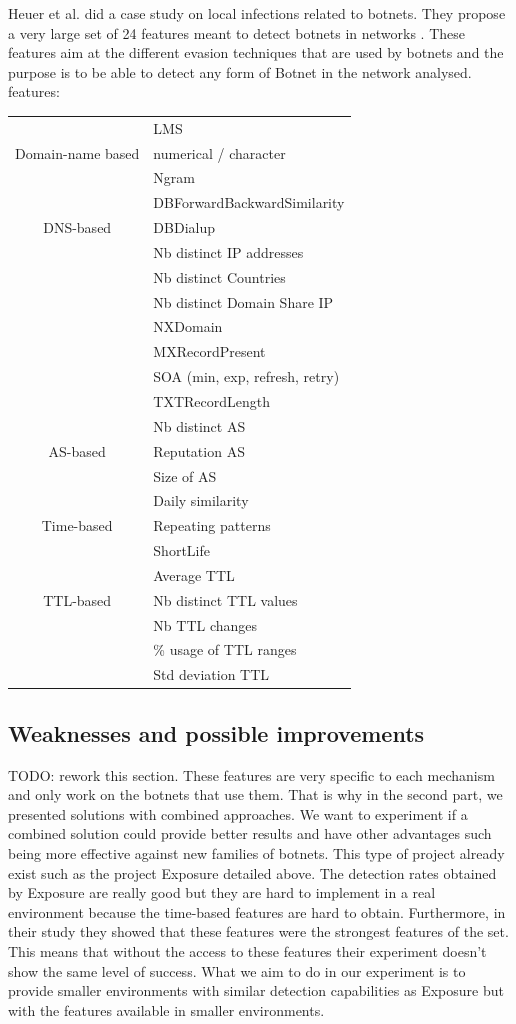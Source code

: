 Heuer et al.\cite{localbotnet} did a case study on local infections related to botnets. They propose a very large set of 24 features meant to detect botnets in networks . These features aim at the different evasion techniques that are used by botnets and the purpose is to be able to detect any form of Botnet in the network analysed.\\
features:
\begin{tabular}{c|l}
\hline
 & LMS\\
Domain-name based & numerical / character\\
& Ngram\\
\hline
 & DBForwardBackwardSimilarity\\
DNS-based & DBDialup\\
& Nb distinct IP addresses\\
& Nb distinct Countries\\
& Nb distinct Domain Share IP\\
& NXDomain\\
& MXRecordPresent\\
& SOA (min, exp, refresh, retry)\\
& TXTRecordLength\\
\hline
 & Nb distinct AS\\
AS-based & Reputation AS\\
& Size of AS\\
\hline
 & Daily similarity\\
Time-based & Repeating patterns\\
& ShortLife\\
\hline
 & Average TTL\\
TTL-based & Nb distinct TTL values\\
& Nb TTL changes\\
& \% usage of TTL ranges\\
& Std deviation TTL\\
\end{tabular}

\subsection{Weaknesses and possible improvements}
TODO: rework this section.
These features are very specific to each mechanism and only work on the botnets that use them. That is why in the second part, we presented solutions with combined approaches. We want to experiment if a combined solution could provide better results and have other advantages such being more effective against new families of botnets. 
This type of project already exist such as the project Exposure detailed above. The detection rates obtained by Exposure are really good but they are hard to implement in a real environment because the time-based features are hard to obtain. Furthermore, in their study they showed that these features were the strongest features of the set. This means that without the access to these features their experiment doesn't show the same level of success. What we aim to do in our experiment is to provide smaller environments with similar detection capabilities as Exposure but with the features available in smaller environments. 


